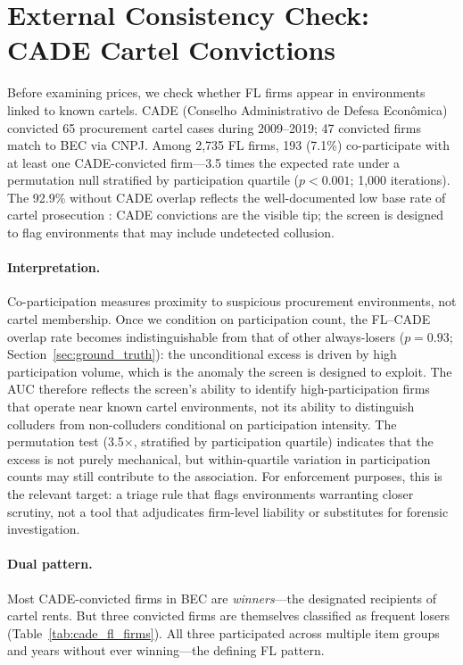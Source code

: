 \section{External Consistency Check: CADE Cartel Convictions}
\label{sec:cade}

Before examining prices, we check whether FL firms appear in
environments linked to known cartels. CADE (Conselho Administrativo
de Defesa Econ\^omica) convicted 65 procurement cartel cases during
2009--2019; 47 convicted firms match to BEC via CNPJ. Among 2,735 FL
firms, 193 (7.1\%) co-participate with at least one CADE-convicted
firm---3.5 times the expected rate under a permutation null stratified
by participation quartile ($p < 0.001$; 1,000 iterations). The 92.9\%
without CADE overlap reflects the well-documented low base rate of
cartel prosecution \citep{connor2007price}: CADE convictions are the
visible tip; the screen is designed to flag environments that may include
undetected collusion.

\paragraph{Interpretation.}
Co-participation measures proximity to suspicious procurement
environments, not cartel membership. Once we condition on
participation count, the FL--CADE overlap rate becomes
indistinguishable from that of other always-losers ($p = 0.93$;
Section~\ref{sec:ground_truth}): the unconditional excess is driven
by high participation volume, which is the anomaly the screen is designed
to exploit. The AUC therefore reflects the screen's ability
to identify high-participation firms that operate near known cartel
environments, not its ability to distinguish colluders from
non-colluders conditional on participation intensity.
The permutation test (3.5$\times$, stratified by
participation quartile) indicates that the excess is not purely
mechanical, but within-quartile variation in participation counts
may still contribute to the association.
For enforcement purposes, this is the relevant target:
a triage rule that flags environments warranting closer scrutiny,
not a tool that adjudicates firm-level liability or substitutes for
forensic investigation.

\paragraph{Dual pattern.}
Most CADE-convicted firms in BEC are \emph{winners}---the designated
recipients of cartel rents. But three convicted firms are themselves
classified as frequent losers (Table~\ref{tab:cade_fl_firms}). All
three participated across multiple item groups and years without ever
winning---the defining FL pattern.

